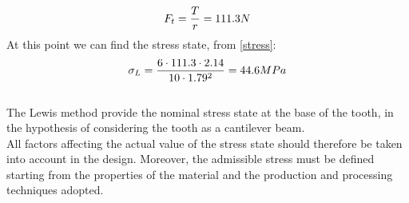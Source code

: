 \begin{equation*}
	\centering
	F_t = \frac{T}{r} = 111.3 N
\end{equation*}
At this point we can find the stress state, from \eqref{stress}:
\begin{equation}
	\centering
	\sigma_L=\frac{6\cdot 111.3\cdot 2.14}{10\cdot 1.79^2} = 44.6 MPa
	\label{stressdata}
\end{equation}\\
The Lewis method provide the nominal stress state at the base of the tooth, in the hypothesis of considering the tooth as a cantilever beam.\\
All factors affecting the actual value of the stress state should therefore be taken into account in the design. Moreover, the admissible stress must be defined starting from the properties of the material and the production and processing techniques adopted.\\
